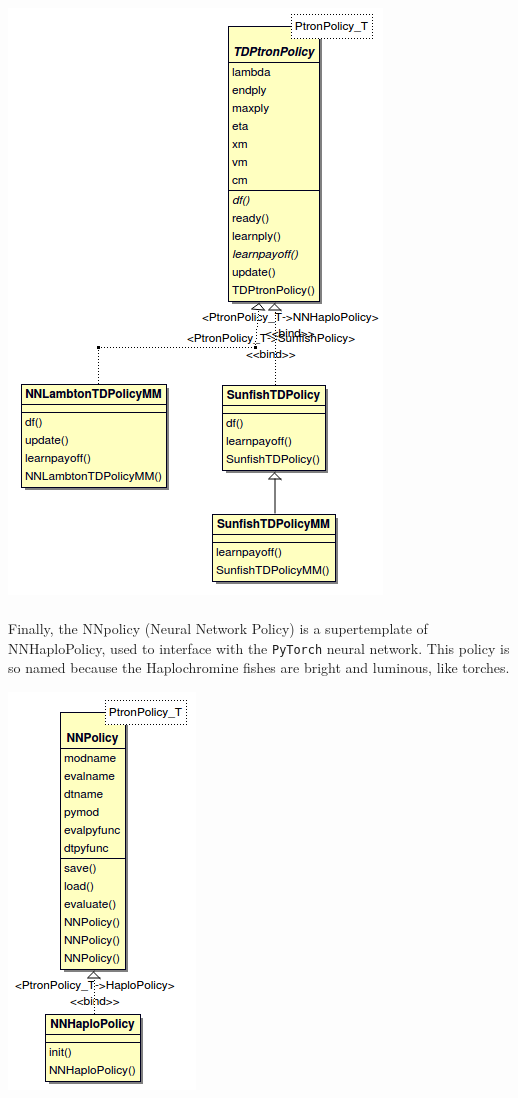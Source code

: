 \documentclass[12pt,a4paper]{book}
\begin{document}
\begin{center}
  \includegraphics[scale=0.6]{umlTemplate.png}
\end{center}

\paragraph{} Finally, the NNpolicy (Neural Network Policy) is a supertemplate of NNHaploPolicy, used to interface with the \texttt{PyTorch} neural network. This policy is so named because the Haplochromine fishes are bright and luminous, like torches.

\begin{center}
  \includegraphics[scale=0.6]{umlPolicyTemplate.png}
\end{center}
\end{document}
